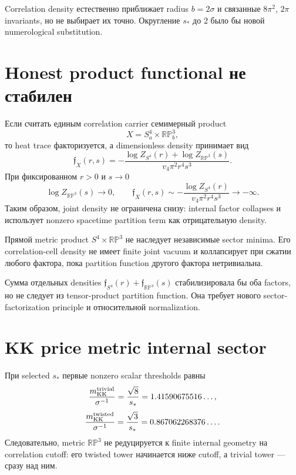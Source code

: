 \begin{proposition}
Correlation density естественно приближает radius \(b=2\sigma\) и связанные
\(8\pi^2\), \(2\pi\) invariants, но не выбирает их точно. Округление
\(s_*\) до \(2\) было бы новой numerological substitution.
\end{proposition}

\section{Honest product functional не стабилен}

Если считать единым correlation carrier семимерный product
\begin{equation}
 X=S^4_a\times\mathbb{RP}^3_b,
\end{equation}
то heat trace факторизуется, а dimensionless density принимает вид
\begin{equation}
 \mathfrak f_X(r,s)
 =-\frac{\log Z_{S^4}(r)+\log Z_{\mathbb{RP}^3}(s)}
 {v_4\pi^2r^4s^3}.
 \label{eq:s4-rp3-joint-density}
\end{equation}
При фиксированном \(r>0\) и \(s\to0\)
\begin{equation}
 \log Z_{\mathbb{RP}^3}(s)\to0,
 \qquad
 \mathfrak f_X(r,s)
 \sim-\frac{\log Z_{S^4}(r)}{v_4\pi^2r^4s^3}
 \longrightarrow-\infty.
\end{equation}
Таким образом, joint density не ограничена снизу: internal factor collapses
и использует nonzero spacetime partition term как отрицательную density.

\begin{theorem}
Прямой metric product \(S^4\times\mathbb{RP}^3\) не наследует независимые
sector minima. Его correlation-cell density не имеет finite joint vacuum и
коллапсирует при сжатии любого фактора, пока partition function другого
фактора нетривиальна.
\end{theorem}

Сумма отдельных densities
\(\mathfrak f_{S^4}(r)+\mathfrak f_{\mathbb{RP}^3}(s)\) стабилизировала бы
оба factors, но не следует из tensor-product partition function. Она требует
нового sector-factorization principle и относительной normalization.

\section{KK price metric internal sector}

При selected \(s_*\) первые nonzero scalar thresholds равны
\begin{equation}
 \frac{m_{\rm KK}^{\rm trivial}}{\sigma^{-1}}
 =\frac{\sqrt8}{s_*}
 =1.41590675516\ldots,
\end{equation}
\begin{equation}
 \frac{m_{\rm KK}^{\rm twisted}}{\sigma^{-1}}
 =\frac{\sqrt3}{s_*}
 =0.867062268376\ldots.
\end{equation}
Следовательно, metric \(\mathbb{RP}^3\) не редуцируется к finite internal
geometry на correlation cutoff: его twisted tower начинается ниже cutoff,
а trivial tower --- сразу над ним.

